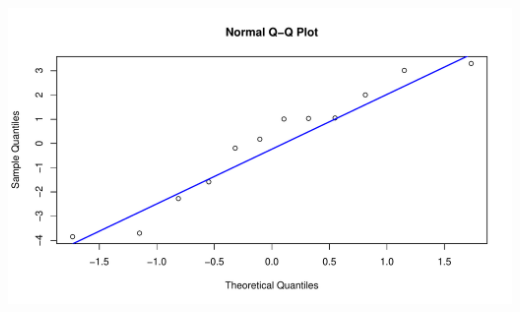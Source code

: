 \documentclass[oneside]{book}\usepackage[]{graphicx}\usepackage[dvipsnames,table,xcdraw]{xcolor}
\makeatletter
\def\maxwidth{ %
  \ifdim\Gin@nat@width>\linewidth
    \linewidth
  \else
    \Gin@nat@width
  \fi
}
\newenvironment{knitrout}{}{} %
\makeatother
\begin{document}
\begin{knitrout}
{\centering \includegraphics[width=\maxwidth]{figure/unnamed-chunk-54-11} 

}


\end{knitrout}

\end{document}
